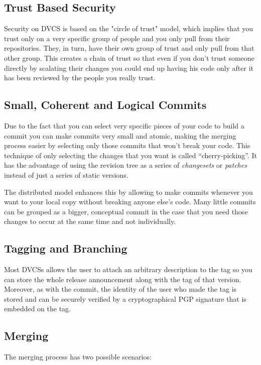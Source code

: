\documentclass[a4paper,10pt]{article}
\begin{document}
\subsection{Trust Based Security}
Security on DVCS is based on the "circle of trust" model, which implies that you trust only on a very specific group of people and you only pull from their repositories. They, in turn, have their own group of trust and only pull from that other group. This creates a chain of trust so that even if you don't trust someone directly by scalating their changes you could end up having his code only after it has been reviewed by the people you really trust.

\subsection{Small, Coherent and Logical Commits}
%
%
Due to the fact that you can select very specific pieces of your code to build a commit you can make commits very small and atomic, making the merging process easier by selecting only those commits that won't break your code. This technique of only selecting the changes that you want is called ``cherry-picking''. It has the advantage of using the revision tree as a series of \emph{changesets} or \emph{patches} instead of just a series of static versions.


The distributed model enhances this by allowing to make commits whenever you want to your local copy without breaking anyone else's code. Many little commits can be grouped as a bigger, conceptual commit in the case that you need those changes to occur at the same time and not individually. 

\subsection{Tagging and Branching}
Most DVCSs allows the user to attach an arbitrary description to the tag so you can store the whole release announcement along with the tag of that version. Moreover, as with the commit, the identity of the user who made the tag is stored and can be securely verified by a cryptographical PGP signature that is embedded on the tag.

\subsection{Merging}
The merging process has two possible scenarios:
\end{document}
